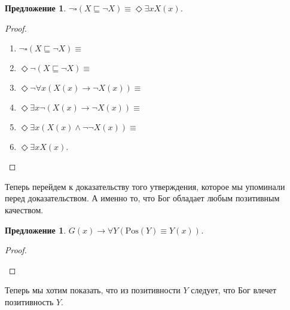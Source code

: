 \documentclass[openany]{book}
\theoremstyle{plain}
\newtheorem{prop}[thm]{Предложение}
\theoremstyle{definition}
\begin{document}
\begin{prop}
    \(\neg \square (X \sqsubseteq \neg X) \equiv \Diamond \exists x X(x)\).
\end{prop}
\begin{proof}
    \begin{enumerate}
	\item \(\neg \square (X \sqsubseteq \neg X) \equiv\)
	\item \(\Diamond \neg (X \sqsubseteq \neg X) \equiv\)
	\item \(\Diamond \neg \forall x (X (x) \to \neg X (x)) \equiv\)
	\item \(\Diamond \exists x \neg (X(x) \to \neg X(x)) \equiv \)
	\item \( \Diamond \exists x (X(x) \land \neg \neg X(x)) \equiv\)
	\item \(\Diamond \exists x X(x).\)
    \end{enumerate}
\end{proof}

Теперь перейдем к доказательству того утверждения, которое мы упоминали перед доказательством. А именно то, что Бог обладает любым позитивным качеством.

\begin{prop}
    \(G(x) \to \forall Y (\mathrm{Pos}(Y) \equiv Y(x))\).
\end{prop}
\begin{proof}
    \begin{prooftree}
    \end{prooftree}
\end{proof}

Теперь мы хотим показать, что из позитивности \(Y\) следует, что Бог влечет позитивность \(Y\).
\end{document}
